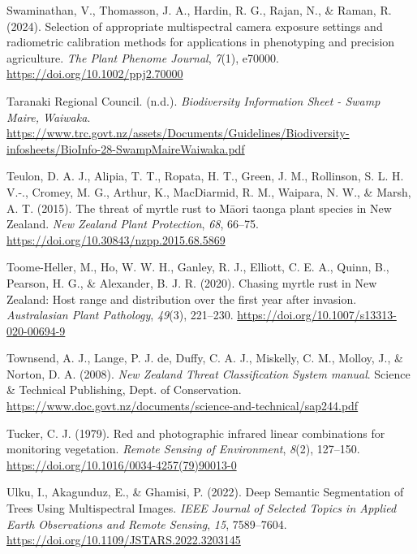 \documentclass[
]{scrreprt}
\newlength{\cslhangindent}
\newenvironment{CSLReferences}[2] %
 {\begin{list}{}{%
  \setlength{\itemindent}{0pt}
  \setlength{\leftmargin}{0pt}
  \setlength{\parsep}{0pt}
  \setlength{\baselineskip}{12pt}
  \ifodd #1
   \setlength{\leftmargin}{\cslhangindent}
   \setlength{\itemindent}{-1\cslhangindent}
  \fi
  \setlength{\itemsep}{4pt}}}
 {\end{list}}
\begin{document}
\begin{CSLReferences}{1}{0}
Swaminathan, V., Thomasson, J. A., Hardin, R. G., Rajan, N., \& Raman,
R. (2024). Selection of appropriate multispectral camera exposure
settings and radiometric calibration methods for applications in
phenotyping and precision agriculture. \emph{The Plant Phenome Journal},
\emph{7}(1), e70000. \url{https://doi.org/10.1002/ppj2.70000}

Taranaki Regional Council. (n.d.). \emph{Biodiversity {Information
Sheet} - {Swamp Maire}, {Waiwaka}}.
\url{https://www.trc.govt.nz/assets/Documents/Guidelines/Biodiversity-infosheets/BioInfo-28-SwampMaireWaiwaka.pdf}

Teulon, D. A. J., Alipia, T. T., Ropata, H. T., Green, J. M., Rollinson,
S. L. H. V.-., Cromey, M. G., Arthur, K., MacDiarmid, R. M., Waipara, N.
W., \& Marsh, A. T. (2015). The threat of myrtle rust to {Māori} taonga
plant species in {New Zealand}. \emph{New Zealand Plant Protection},
\emph{68}, 66--75. \url{https://doi.org/10.30843/nzpp.2015.68.5869}

Toome-Heller, M., Ho, W. W. H., Ganley, R. J., Elliott, C. E. A., Quinn,
B., Pearson, H. G., \& Alexander, B. J. R. (2020). Chasing myrtle rust
in {New Zealand}: Host range and distribution over the first year after
invasion. \emph{Australasian Plant Pathology}, \emph{49}(3), 221--230.
\url{https://doi.org/10.1007/s13313-020-00694-9}

Townsend, A. J., Lange, P. J. de, Duffy, C. A. J., Miskelly, C. M.,
Molloy, J., \& Norton, D. A. (2008). \emph{New {Zealand Threat
Classification System} manual}. Science \& Technical Publishing, Dept.
of Conservation.
\url{https://www.doc.govt.nz/documents/science-and-technical/sap244.pdf}

Tucker, C. J. (1979). Red and photographic infrared linear combinations
for monitoring vegetation. \emph{Remote Sensing of Environment},
\emph{8}(2), 127--150.
\url{https://doi.org/10.1016/0034-4257(79)90013-0}

Ulku, I., Akagunduz, E., \& Ghamisi, P. (2022). Deep {Semantic
Segmentation} of {Trees Using Multispectral Images}. \emph{IEEE Journal
of Selected Topics in Applied Earth Observations and Remote Sensing},
\emph{15}, 7589--7604. \url{https://doi.org/10.1109/JSTARS.2022.3203145}


\end{CSLReferences}
\end{document}
